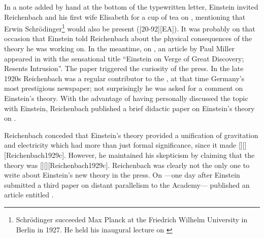 \documentclass[draft]{article}
\begin{document}
In a note added by hand at the bottom of the typewritten letter, Einstein invited Reichenbach and his first wife Elisabeth for a cup of tea on , mentioning that Erwin Schrödinger\footnote{Schrödinger succeeded Max Planck at the Friedrich Wilhelm University in Berlin in 1927. He held his inaugural lecture on  \citep{Schroedinger1929a}} would also be present ([20-92][EA]). It was probably on that occasion that Einstein told Reichenbach about the physical consequences of the theory he was working on. In the meantime, on , an article by Paul Miller appeared in  with the sensational title \enquote{Einstein on Verge of Great Discovery; Resents Intrusion}. The paper triggered the curiosity of the press. In the late 1920s Reichenbach was a regular contributor to the , at that time Germany's most prestigious newspaper; not surprisingly he was asked for a comment on Einstein's theory. With the advantage of having personally discussed the topic with Einstein, Reichenbach published a brief didactic paper on Einstein's theory on  \citep{Reichenbach1929c}. 

Reichenbach conceded that Einstein's theory provided a unification of gravitation and electricity which had more than just formal significance, since it made [][][Reichenbach1929c]. However, he maintained his skepticism by claiming that the theory was [][\me][Reichenbach1929c]. Reichenbach was clearly not the only one to write about Einstein's new theory in the press. On ---one day after Einstein submitted a third paper on distant parallelism \citep{Einstein1929b} to the Academy--- published an article entitled . 
\end{document}
